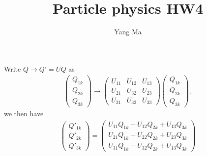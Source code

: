 \documentclass[11pt]{article}
\begin{document}
\title{Particle physics HW4}
\author{Yang Ma}

\maketitle

\section{ }
Write $Q\to Q'= UQ$ as
\begin{eqnarray}
  \begin{pmatrix}
    Q_{1k}\\ Q_{2k} \\ Q_{3k}
  \end{pmatrix}
    \to 
  \begin{pmatrix}
    U_{11} & U_{12} & U_{13} \\
    U_{21} & U_{32} & U_{23} \\
    U_{31} & U_{32} & U_{33}
  \end{pmatrix}
  \begin{pmatrix}
    Q_{1k}\\ Q_{2k} \\ Q_{3k}
  \end{pmatrix},
\end{eqnarray}
we then have 
\begin{eqnarray}
  \begin{pmatrix}
    Q'_{1k}\\ Q'_{2k} \\ Q'_{3k}
  \end{pmatrix}
  =
  \begin{pmatrix}
    U_{11} Q_{1k}+ U_{12} Q_{2k} +U_{13} Q_{3k} \\
    U_{21} Q_{1k}+ U_{22} Q_{2k} +U_{23} Q_{3k} \\
    U_{31} Q_{1k}+ U_{32} Q_{2k} +U_{13} Q_{3k} 
  \end{pmatrix}
\end{eqnarray}
\end{document}
